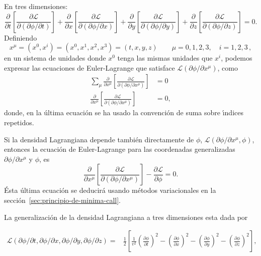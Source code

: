En tres dimensiones:
\begin{equation}
  \label{eq:eelcalls1m}
\frac{\partial}{\partial t}
  \left[
    \frac{\partial\mathcal{L}}{\partial
      (\partial\phi/\partial t)}
  \right]+\frac{\partial}{\partial x}
  \left[
    \frac{\partial\mathcal{L}}{\partial
      (\partial\phi/\partial x)}
  \right]+\frac{\partial}{\partial y}
  \left[
    \frac{\partial\mathcal{L}}{\partial
      (\partial\phi/\partial y)}
  \right]+\frac{\partial}{\partial z}
  \left[
    \frac{\partial\mathcal{L}}{\partial
      (\partial\phi/\partial z)}
  \right]=0.
\end{equation}
Definiendo
\begin{equation}
  \label{eq:xmu}
  x^\mu=(x^0,x^i)=(x^0,x^1,x^2,x^3)=(t,x,y,z) \qquad \mu=0,1,2,3,\quad i=1,2,3\,,
\end{equation}
en un sistema de unidades donde $x^0$ tenga las mismas unidades que
$x^i$, podemos expresar las ecuaciones de Euler-Lagrange que satisface
$\mathcal{L}(\partial\phi/\partial x^\mu)$, como
\begin{align*}
 \sum_\mu\frac{\partial}{\partial x^\mu}
  \left[
    \frac{\partial\mathcal{L}}{\partial
      (\partial\phi/\partial x^\mu)}
  \right]&=0\\
 \frac{\partial}{\partial x^\mu}
  \left[
    \frac{\partial\mathcal{L}}{\partial
      (\partial\phi/\partial x^\mu)}
  \right]&=0,
\end{align*}
donde, en la \'ultima ecuaci\'on se ha usado la convenci\'on de suma sobre
\'\i ndices repetidos. 

Si la densidad Lagrangiana depende tambi\'en directamente de $\phi$,
$\mathcal{L}(\partial\phi/\partial x^\mu,\phi)$, entonces la ecuaci\'on de Euler-Lagrange para
las coordenadas generalizadas  $\partial\phi/\partial x^\mu$ y $\phi$, es
\begin{equation}
\label{eq:eelcallf}
 \frac{\partial}{\partial x^\mu}
  \left[
    \frac{\partial\mathcal{L}}{\partial
      (\partial\phi/\partial x^\mu)}
  \right]-\frac{\partial\mathcal{L}}{\partial\phi}=0.
\end{equation}
\'Esta \'ultima ecuaci\'on se deducir\'a usando m\'etodos variacionales en la
secci\'on~\ref{sec:principio-de-minima-call}.

La generalización de la densidad Lagrangiana a tres dimensiones esta dada por


\begin{align}
  \label{eq:dlc3d}
  \mathcal{L}(\partial\phi/\partial t,\partial\phi/\partial x,\partial\phi/\partial y,\partial\phi/\partial z)
=&\frac{1}{2}
\left[
  \frac{1}{v^2}\left(\frac{\partial\phi}{\partial t}\right)^2-\left(\frac{\partial\phi}{\partial x}\right)^2-\left(\frac{\partial\phi}{\partial y}\right)^2-\left(\frac{\partial\phi}{\partial z}\right)^2
\right],
\end{align}


